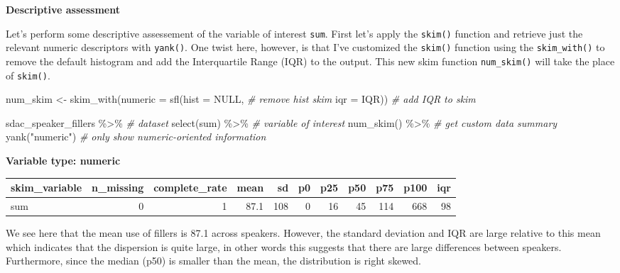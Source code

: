 \documentclass[
]{article}
\newenvironment{Shaded}{\begin{snugshade}}{\end{snugshade}}
\newcommand{\AttributeTok}[1]{\textcolor[rgb]{0.77,0.63,0.00}{#1}}
\newcommand{\CommentTok}[1]{\textcolor[rgb]{0.56,0.35,0.01}{\textit{#1}}}
\newcommand{\ConstantTok}[1]{\textcolor[rgb]{0.00,0.00,0.00}{#1}}
\newcommand{\FunctionTok}[1]{\textcolor[rgb]{0.00,0.00,0.00}{#1}}
\newcommand{\NormalTok}[1]{#1}
\newcommand{\OtherTok}[1]{\textcolor[rgb]{0.56,0.35,0.01}{#1}}
\newcommand{\SpecialCharTok}[1]{\textcolor[rgb]{0.00,0.00,0.00}{#1}}
\newcommand{\StringTok}[1]{\textcolor[rgb]{0.31,0.60,0.02}{#1}}
\begin{document}
\textbf{Descriptive assessment}

Let's perform some descriptive assessement of the variable of interest \texttt{sum}. First let's apply the \texttt{skim()} function and retrieve just the relevant numeric descriptors with \texttt{yank()}. One twist here, however, is that I've customized the \texttt{skim()} function using the \texttt{skim\_with()} to remove the default histogram and add the Interquartile Range (IQR) to the output. This new skim function \texttt{num\_skim()} will take the place of \texttt{skim()}.

\begin{Shaded}
\begin{Highlighting}[]
\NormalTok{num\_skim }\OtherTok{\textless{}{-}} 
  \FunctionTok{skim\_with}\NormalTok{(}\AttributeTok{numeric =} \FunctionTok{sfl}\NormalTok{(}\AttributeTok{hist =} \ConstantTok{NULL}\NormalTok{, }\CommentTok{\# remove hist skim}
                                   \AttributeTok{iqr =}\NormalTok{ IQR)) }\CommentTok{\# add IQR to skim}

\NormalTok{sdac\_speaker\_fillers }\SpecialCharTok{\%\textgreater{}\%} \CommentTok{\# dataset}
  \FunctionTok{select}\NormalTok{(sum) }\SpecialCharTok{\%\textgreater{}\%} \CommentTok{\# variable of interest}
  \FunctionTok{num\_skim}\NormalTok{() }\SpecialCharTok{\%\textgreater{}\%} \CommentTok{\# get custom data summary}
  \FunctionTok{yank}\NormalTok{(}\StringTok{"numeric"}\NormalTok{) }\CommentTok{\# only show numeric{-}oriented information}
\end{Highlighting}
\end{Shaded}

\textbf{Variable type: numeric}

\begin{tabular}{l|r|r|r|r|r|r|r|r|r|r}
\hline
skim\_variable & n\_missing & complete\_rate & mean & sd & p0 & p25 & p50 & p75 & p100 & iqr\\
\hline
sum & 0 & 1 & 87.1 & 108 & 0 & 16 & 45 & 114 & 668 & 98\\
\hline
\end{tabular}

We see here that the mean use of fillers is 87.1 across speakers. However, the standard deviation and IQR are large relative to this mean which indicates that the dispersion is quite large, in other words this suggests that there are large differences between speakers. Furthermore, since the median (p50) is smaller than the mean, the distribution is right skewed.
\end{document}
